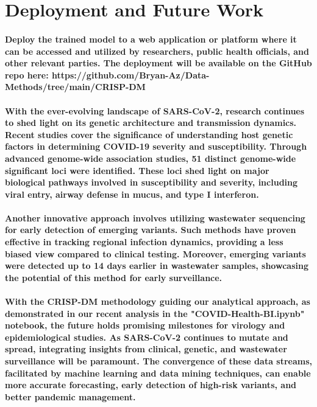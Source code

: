 \documentclass{article}
\begin{document}
\section{\textbf{Deployment and Future Work}}
\paragraph{Deploy the trained model to a web application or platform where it can be accessed and utilized by researchers, public health officials, and other relevant parties. The deployment will be available on the GitHub repo here: https://github.com/Bryan-Az/Data-Methods/tree/main/CRISP-DM}
\paragraph{With the ever-evolving landscape of SARS-CoV-2, research continues to shed light on its genetic architecture and transmission dynamics. Recent studies \parencite{masahiro_kanai_69ddf437} cover the significance of understanding host genetic factors in determining COVID-19 severity and susceptibility. Through advanced genome-wide association studies, 51 distinct genome-wide significant loci were identified. These loci shed light on major biological pathways involved in susceptibility and severity, including viral entry, airway defense in mucus, and type I interferon.}
\paragraph{Another innovative approach \parencite{smruthi_karthikeyan_cd33e450} involves utilizing wastewater sequencing for early detection of emerging variants. Such methods have proven effective in tracking regional infection dynamics, providing a less biased view compared to clinical testing. Moreover, emerging variants were detected up to 14 days earlier in wastewater samples, showcasing the potential of this method for early surveillance.}
\paragraph{With the CRISP-DM methodology guiding our analytical approach, as demonstrated in our recent analysis in the "COVID-Health-BI.ipynb" notebook, the future holds promising milestones for virology and epidemiological studies. As SARS-CoV-2 continues to mutate and spread, integrating insights from clinical, genetic, and wastewater surveillance will be paramount. The convergence of these data streams, facilitated by machine learning and data mining techniques, can enable more accurate forecasting, early detection of high-risk variants, and better pandemic management.}
\end{document}
